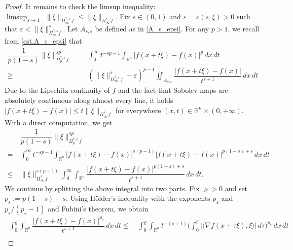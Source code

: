 \documentclass[11pt, reqno]{article}
\theoremstyle{definition}
\numberwithin{equation}{section}
\newcommand{\R}{\mathbb{R}}
\begin{document}
\begin{proof}
It remains to check the limsup inequality: $\textstyle\limsup_{s \to 1^-} \| \xi \|_{\Pi^{\ast, s}_\infty \, f} \leq \| \xi \|_{\Pi^\ast_\infty \, f}$.
Fix $s \in  (0, 1)$ and $\varepsilon = \varepsilon(s, \xi) > 0$ such that $\varepsilon < \| \xi \|_{\Pi^{\ast, s}_\infty f}^s$.
Let $A_{s, \varepsilon}$ be defined as in \eqref{A_s_epsi}.
For any $p > 1$, we recall from \eqref{est.A_s_epsi} that
	\begin{equation}\label{esti.iii-01}
        \begin{split}
		\dfrac{1}{p(1 - s)}\| \xi \|^{sp}_{\Pi^{\ast, s}_p \, f} = & ~ \int_0^\infty t^{-sp - 1} \int_{\R^n} |f(x + t \xi) - f(x)|^p \, dx \, dt \\
        \geq & ~  \left( \| \xi \|^s_{\Pi^{\ast, s}_\infty \, f} - \varepsilon \right)^{p - 1}\iint_{A_{s, \varepsilon}} \dfrac{|f(x +t\xi) - f(x)|}{t^{s + 1}} \, dx \, dt
        \end{split}
	\end{equation}
Due to the Lipschitz continuity of $f$ and the fact that Sobolev maps are absolutely continuous along almost every line, it holds $|f(x + t \xi) - f(x)| \leq t \| \xi \|_{\Pi^\ast_\infty \, f}$ for everywhere $(x, t) \in \R^n \times (0, + \infty)$.
With a direct computation, we get
	\begin{equation}\label{Mdiff.01}
        \begin{split}
		& ~ \dfrac{1}{p(1 - s)}\| \xi \|^{sp}_{\Pi^{\ast, s}_p \, f} \\
        = &~ \int_0^\infty t^{-sp - 1} \int_{\R^n} |f(x + t \xi) - f(x)|^{s(p - 1)} |f(x + t \xi) - f(x)|^{p(1 - s) + s} \, dx \, dt \\
		\leq & ~ \| \xi \|_{\Pi^\ast_\infty \, f}^{s(p - 1)} \int_0^\infty \int_{\R^n} \dfrac{|f(x + t \xi) - f(x)|^{p(1 - s) + s}}{t^{s + 1}} \, dx \, dt.
        \end{split}
	\end{equation}
We continue by splitting the above integral into two parts.
Fix $\varrho > 0$ and set $p_s := p(1 - s) + s$.
Using H\"older's inequality with the exponents $p_s$ and $p_s/(p_s - 1)$ and Fubini's theorem, we obtain
	\begin{equation}\label{Mdiff.02}
        \begin{alignedat}{3}
		~ \int_0^\varrho \int_{\R^n} \dfrac{|f(x + t \xi) - f(x)|^{p_s}}{t^{s + 1}} \, dx \, dt  \leq &  ~ 
        \int_0^\varrho \int_{\R^n} t^{-(s + 1)}  \Big( \int_0^t | \langle \nabla f(x + \tau \xi), \xi \rangle | \, d\tau \Big)^{p_s} \, dx \, dt &
        \\

\end{alignedat}
\end{equation}
\end{proof}
\end{document}
